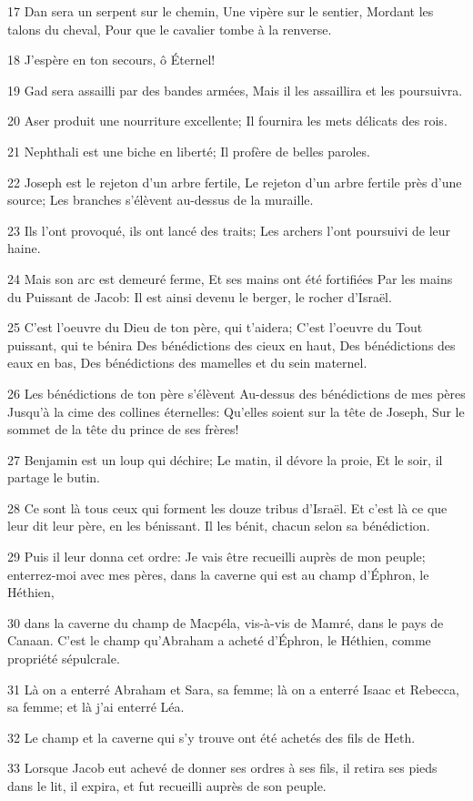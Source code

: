 \par 17 Dan sera un serpent sur le chemin, Une vipère sur le sentier, Mordant les talons du cheval, Pour que le cavalier tombe à la renverse.
\par 18 J'espère en ton secours, ô Éternel!
\par 19 Gad sera assailli par des bandes armées, Mais il les assaillira et les poursuivra.
\par 20 Aser produit une nourriture excellente; Il fournira les mets délicats des rois.
\par 21 Nephthali est une biche en liberté; Il profère de belles paroles.
\par 22 Joseph est le rejeton d'un arbre fertile, Le rejeton d'un arbre fertile près d'une source; Les branches s'élèvent au-dessus de la muraille.
\par 23 Ils l'ont provoqué, ils ont lancé des traits; Les archers l'ont poursuivi de leur haine.
\par 24 Mais son arc est demeuré ferme, Et ses mains ont été fortifiées Par les mains du Puissant de Jacob: Il est ainsi devenu le berger, le rocher d'Israël.
\par 25 C'est l'oeuvre du Dieu de ton père, qui t'aidera; C'est l'oeuvre du Tout puissant, qui te bénira Des bénédictions des cieux en haut, Des bénédictions des eaux en bas, Des bénédictions des mamelles et du sein maternel.
\par 26 Les bénédictions de ton père s'élèvent Au-dessus des bénédictions de mes pères Jusqu'à la cime des collines éternelles: Qu'elles soient sur la tête de Joseph, Sur le sommet de la tête du prince de ses frères!
\par 27 Benjamin est un loup qui déchire; Le matin, il dévore la proie, Et le soir, il partage le butin.
\par 28 Ce sont là tous ceux qui forment les douze tribus d'Israël. Et c'est là ce que leur dit leur père, en les bénissant. Il les bénit, chacun selon sa bénédiction.
\par 29 Puis il leur donna cet ordre: Je vais être recueilli auprès de mon peuple; enterrez-moi avec mes pères, dans la caverne qui est au champ d'Éphron, le Héthien,
\par 30 dans la caverne du champ de Macpéla, vis-à-vis de Mamré, dans le pays de Canaan. C'est le champ qu'Abraham a acheté d'Éphron, le Héthien, comme propriété sépulcrale.
\par 31 Là on a enterré Abraham et Sara, sa femme; là on a enterré Isaac et Rebecca, sa femme; et là j'ai enterré Léa.
\par 32 Le champ et la caverne qui s'y trouve ont été achetés des fils de Heth.
\par 33 Lorsque Jacob eut achevé de donner ses ordres à ses fils, il retira ses pieds dans le lit, il expira, et fut recueilli auprès de son peuple.

